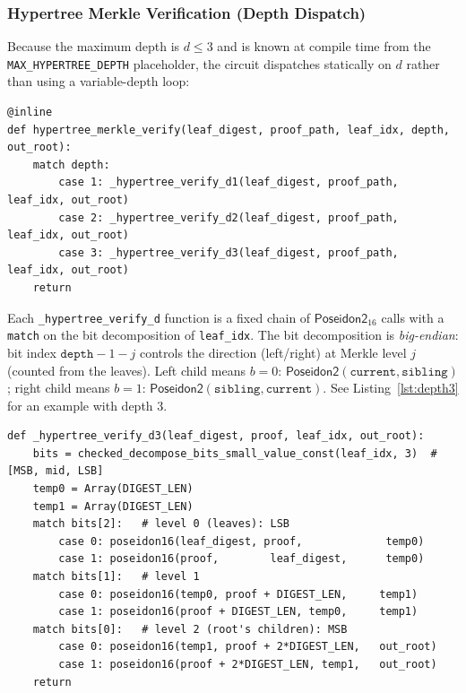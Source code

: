 \documentclass[11pt,a4paper]{article}
\newcommand{\poseidon}{\textsf{Poseidon2}\xspace}
\begin{document}
\subsubsection{Hypertree Merkle Verification (Depth Dispatch)}

Because the maximum depth is $d \leq 3$ and is known at compile time from the \texttt{MAX\_HYPERTREE\_DEPTH} placeholder, the circuit dispatches statically on $d$ rather than using a variable-depth loop:

\begin{lstlisting}[style=zkdsl, caption={Depth dispatch in \texttt{threshold\_aggregate.py}}]
@inline
def hypertree_merkle_verify(leaf_digest, proof_path, leaf_idx, depth, out_root):
    match depth:
        case 1: _hypertree_verify_d1(leaf_digest, proof_path, leaf_idx, out_root)
        case 2: _hypertree_verify_d2(leaf_digest, proof_path, leaf_idx, out_root)
        case 3: _hypertree_verify_d3(leaf_digest, proof_path, leaf_idx, out_root)
    return
\end{lstlisting}

Each \texttt{\_hypertree\_verify\_d} function is a fixed chain of $\poseidon_{16}$ calls with a \texttt{match} on the bit decomposition of \texttt{leaf\_idx}.  The bit decomposition is \emph{big-endian}: bit index $\texttt{depth}-1-j$ controls the direction (left/right) at Merkle level $j$ (counted from the leaves).  Left child means $b=0$: $\poseidon(\texttt{current}, \texttt{sibling})$; right child means $b=1$: $\poseidon(\texttt{sibling}, \texttt{current})$.
See Listing~\ref{lst:depth3} for an example with depth 3.

\begin{lstlisting}[style=zkdsl, caption={Depth-3 Merkle verification}, label=lst:depth3]
def _hypertree_verify_d3(leaf_digest, proof, leaf_idx, out_root):
    bits = checked_decompose_bits_small_value_const(leaf_idx, 3)  # [MSB, mid, LSB]
    temp0 = Array(DIGEST_LEN)
    temp1 = Array(DIGEST_LEN)
    match bits[2]:   # level 0 (leaves): LSB
        case 0: poseidon16(leaf_digest, proof,             temp0)
        case 1: poseidon16(proof,        leaf_digest,      temp0)
    match bits[1]:   # level 1
        case 0: poseidon16(temp0, proof + DIGEST_LEN,     temp1)
        case 1: poseidon16(proof + DIGEST_LEN, temp0,     temp1)
    match bits[0]:   # level 2 (root's children): MSB
        case 0: poseidon16(temp1, proof + 2*DIGEST_LEN,   out_root)
        case 1: poseidon16(proof + 2*DIGEST_LEN, temp1,   out_root)
    return
\end{lstlisting}
\end{document}

